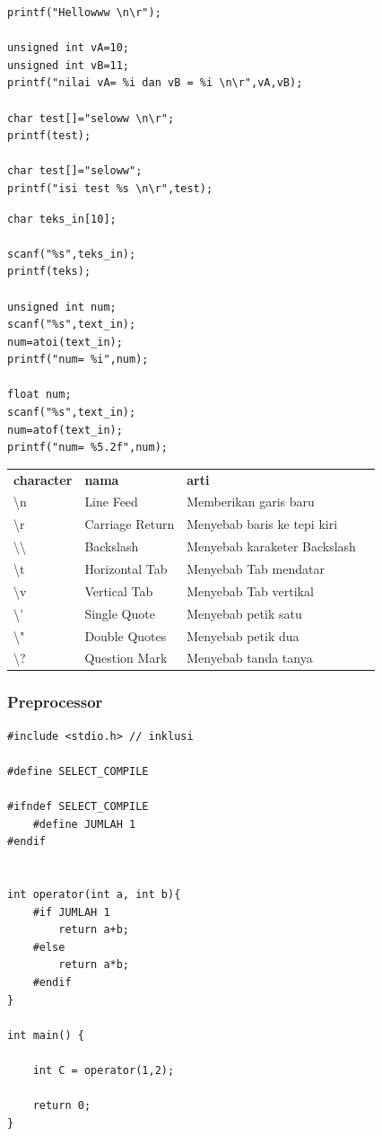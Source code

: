 \documentclass[12pt,]{article}
\begin{document}
	\begin{verbatim}
printf("Hellowww \n\r");

unsigned int vA=10;
unsigned int vB=11;
printf("nilai vA= %i dan vB = %i \n\r",vA,vB);

char test[]="seloww \n\r";
printf(test);

char test[]="seloww";
printf("isi test %s \n\r",test);
	\end{verbatim}
	
	\begin{verbatim}
char teks_in[10];

scanf("%s",teks_in);
printf(teks);

unsigned int num;
scanf("%s",text_in);
num=atoi(text_in);
printf("num= %i",num);

float num;
scanf("%s",text_in);
num=atof(text_in);
printf("num= %5.2f",num);
	\end{verbatim}
	
	\begin{table}[H]
		\begin{tabular}{|l|l|l|l}
			\cline{1-3}
			\textbf{character} & \textbf{nama} & \textbf{arti} \\ \cline{1-3}
			\textbackslash n          & Line Feed	   & Memberikan garis baru        \\ \cline{1-3}
			\textbackslash r          & Carriage Return & Menyebab baris ke tepi kiri  \\ \cline{1-3}
			\textbackslash \textbackslash & Backslash       & Menyebab karaketer Backslash \\ \cline{1-3}
			\textbackslash t          & Horizontal Tab  & Menyebab Tab mendatar        \\ \cline{1-3}
			\textbackslash v          & Vertical Tab    & Menyebab Tab vertikal        \\ \cline{1-3}
			\textbackslash '          & Single Quote    & Menyebab petik satu          \\ \cline{1-3}
			\textbackslash "          & Double Quotes   & Menyebab petik dua           \\ \cline{1-3}
			\textbackslash ?          & Question Mark   & Menyebab tanda tanya         \\ \cline{1-3}
		\end{tabular}
	\end{table}
	
	\newpage
	\subsubsection{Preprocessor}
	\begin{verbatim}
#include <stdio.h> // inklusi

#define SELECT_COMPILE

#ifndef SELECT_COMPILE
	#define JUMLAH 1
#endif


int operator(int a, int b){
	#if JUMLAH 1
		return a+b;
	#else
		return a*b;
	#endif
}

int main() {
		
	int C = operator(1,2);	
	
	return 0;
}	
	\end{verbatim}
	
\end{document}
